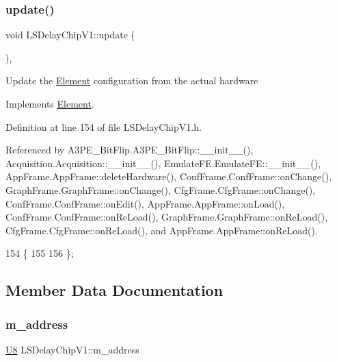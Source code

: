 \subsubsection{\texorpdfstring{update()}{update()}}
{\footnotesize\ttfamily void L\+S\+Delay\+Chip\+V1\+::update (\begin{DoxyParamCaption}{ }\end{DoxyParamCaption})\hspace{0.3cm}{\ttfamily [inline]}, {\ttfamily [virtual]}}

Update the \hyperlink{classElement}{Element} configuration from the actual hardware 

Implements \hyperlink{classElement_a4e6c83efae95616ebddd03c793a26661}{Element}.



Definition at line 154 of file L\+S\+Delay\+Chip\+V1.\+h.



Referenced by A3\+P\+E\+\_\+\+Bit\+Flip.\+A3\+P\+E\+\_\+\+Bit\+Flip\+::\+\_\+\+\_\+init\+\_\+\+\_\+(), Acquisition.\+Acquisition\+::\+\_\+\+\_\+init\+\_\+\+\_\+(), Emulate\+F\+E.\+Emulate\+F\+E\+::\+\_\+\+\_\+init\+\_\+\+\_\+(), App\+Frame.\+App\+Frame\+::delete\+Hardware(), Conf\+Frame.\+Conf\+Frame\+::on\+Change(), Graph\+Frame.\+Graph\+Frame\+::on\+Change(), Cfg\+Frame.\+Cfg\+Frame\+::on\+Change(), Conf\+Frame.\+Conf\+Frame\+::on\+Edit(), App\+Frame.\+App\+Frame\+::on\+Load(), Conf\+Frame.\+Conf\+Frame\+::on\+Re\+Load(), Graph\+Frame.\+Graph\+Frame\+::on\+Re\+Load(), Cfg\+Frame.\+Cfg\+Frame\+::on\+Re\+Load(), and App\+Frame.\+App\+Frame\+::on\+Re\+Load().


\begin{DoxyCode}
154                  \{
155     
156   \};
\end{DoxyCode}


\subsection{Member Data Documentation}
\mbox{\label{classLSDelayChipV1_a6fba278fd2ac602c796b5e5cebf2d2de}} 
\subsubsection{\texorpdfstring{m\+\_\+address}{m\_address}}
{\footnotesize\ttfamily \hyperlink{ICECALv3_8h_a3cb25ca6f51f003950f9625ff05536fc}{U8} L\+S\+Delay\+Chip\+V1\+::m\+\_\+address\hspace{0.3cm}{\ttfamily [private]}}



